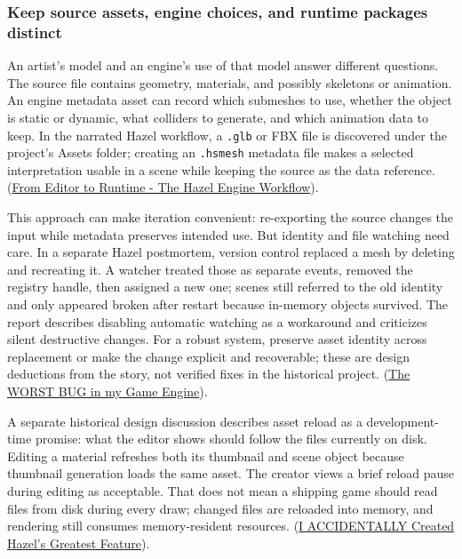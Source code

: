 \subsubsection{Keep source assets, engine choices, and runtime packages distinct}\label{06-engine-ii-ch032-keep-source-assets-engine-choices-and-runtime-packages-distinct}

\hypertarget{06-engine-ii-ch032-keep-source-assets-engine-choices-and-runtime-packages-distinct}{}

An artist's model and an engine's use of that model answer different questions. The source file contains geometry, materials, and possibly skeletons or animation. An engine metadata asset can record which submeshes to use, whether the object is static or dynamic, what colliders to generate, and which animation data to keep. In the narrated Hazel workflow, a \texttt{.glb} or FBX file is discovered under the project's Assets folder; creating an \texttt{.hsmesh} metadata file makes a selected interpretation usable in a scene while keeping the source as the data reference. (\href{https://www.youtube.com/watch?v=Z2U-S3fxAg8&t=8m48s}{From Editor to Runtime - The Hazel Engine Workflow}).

This approach can make iteration convenient: re-exporting the source changes the input while metadata preserves intended use. But identity and file watching need care. In a separate Hazel postmortem, version control replaced a mesh by deleting and recreating it. A watcher treated those as separate events, removed the registry handle, then assigned a new one; scenes still referred to the old identity and only appeared broken after restart because in-memory objects survived. The report describes disabling automatic watching as a workaround and criticizes silent destructive changes. For a robust system, preserve asset identity across replacement or make the change explicit and recoverable; these are design deductions from the story, not verified fixes in the historical project. (\href{https://www.youtube.com/watch?v=x5dy8T9dRPk&t=0m3s}{The WORST BUG in my Game Engine}).

A separate historical design discussion describes asset reload as a development-time promise: what the editor shows should follow the files currently on disk. Editing a material refreshes both its thumbnail and scene object because thumbnail generation loads the same asset. The creator views a brief reload pause during editing as acceptable. That does not mean a shipping game should read files from disk during every draw; changed files are reloaded into memory, and rendering still consumes memory-resident resources. (\href{https://www.youtube.com/watch?v=yMRp9DVZYnI&t=13m14s}{I ACCIDENTALLY Created Hazel's Greatest Feature}).

